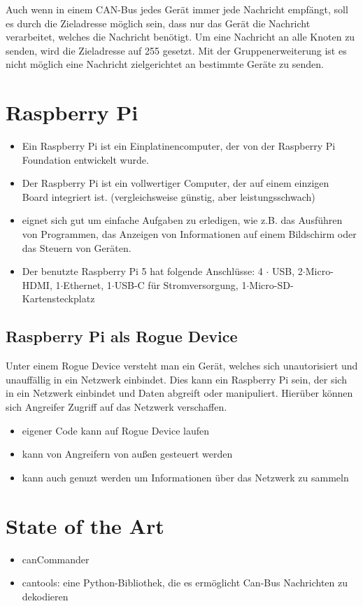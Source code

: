 Auch wenn in einem CAN-Bus jedes Gerät immer jede Nachricht empfängt, soll es durch die Zieladresse möglich sein,
dass nur das Gerät die Nachricht verarbeitet, welches die Nachricht benötigt. Um eine Nachricht an alle Knoten 
zu senden, wird die Zieladresse auf 255 gesetzt. Mit der Gruppenerweiterung ist es nicht möglich eine Nachricht 
zielgerichtet an bestimmte Geräte zu senden. \cite{Murvay2018}




\section{Raspberry Pi}
\begin{itemize}
    \item Ein Raspberry Pi ist ein Einplatinencomputer, der von der Raspberry Pi Foundation entwickelt wurde.
    \item Der Raspberry Pi ist ein vollwertiger Computer, der auf einem einzigen Board integriert ist. (vergleichsweise günstig, aber leistungsschwach)
    \item eignet sich gut um einfache Aufgaben zu erledigen, wie z.B. das Ausführen von Programmen, das Anzeigen von Informationen auf einem Bildschirm oder das Steuern von Geräten.
    \item Der benutzte Raspberry Pi 5 hat folgende Anschlüsse: 4 $\cdot$ USB, 2$\cdot$Micro-HDMI, 1$\cdot$Ethernet, 1$\cdot$USB-C für Stromversorgung, 1$\cdot$Micro-SD-Kartensteckplatz
\end{itemize}

\subsection{Raspberry Pi als Rogue Device}
Unter einem Rogue Device versteht man ein Gerät, welches sich unautorisiert und unauffällig in ein Netzwerk einbindet. \cite{Scarfone2008}
Dies kann ein Raspberry Pi sein, der sich in ein Netzwerk einbindet und Daten abgreift oder manipuliert. Hierüber können 
sich Angreifer Zugriff auf das Netzwerk verschaffen. 
\begin{itemize}
    \item eigener Code kann auf Rogue Device laufen
    \item kann von Angreifern von außen gesteuert werden
    \item kann auch genuzt werden um Informationen über das Netzwerk zu sammeln
\end{itemize}

\section{State of the Art}
\begin{itemize}
    \item canCommander
    \item cantools: eine Python-Bibliothek, die es ermöglicht Can-Bus Nachrichten zu dekodieren
\end{itemize}
